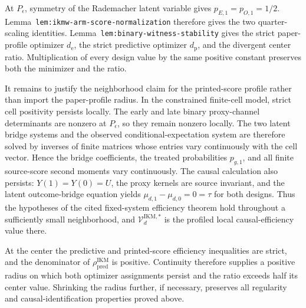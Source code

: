 At \(P_\epsilon\), symmetry of the Rademacher latent variable gives \(p_{E,1}=p_{O,1}=1/2\). Lemma~\texttt{lem:ikmw-arm-score-normalization} therefore gives the two quarter-scaling identities. Lemma~\texttt{lem:binary-witness-stability} gives the strict paper-profile optimizer \(d_{\mathrm e}\), the strict predictive optimizer \(d_{\mathrm p}\), and the divergent center ratio. Multiplication of every design value by the same positive constant preserves both the minimizer and the ratio.

It remains to justify the neighborhood claim for the printed-score profile rather than import the paper-profile radius.  In the constrained finite-cell model, strict cell positivity persists locally.  The early and late binary proxy-channel determinants are nonzero at \(P_\epsilon\), so they remain nonzero locally.  The two latent bridge systems and the observed conditional-expectation system are therefore solved by inverses of finite matrices whose entries vary continuously with the cell vector.  Hence the bridge coefficients, the treated probabilities \(p_{g,1}\), and all finite source-score second moments vary continuously.  The causal calculation also persists: \(Y(1)=Y(0)=U\), the proxy kernels are source invariant, and the latent outcome-bridge equation yields \(\mu_{d,1}-\mu_{d,0}=0=\tau\) for both designs.  Thus the hypotheses of the cited fixed-system efficiency theorem hold throughout a sufficiently small neighborhood, and \(\mathcal V_d^{\mathrm{IKM},*}\) is the profiled local causal-efficiency value there.

At the center the predictive and printed-score efficiency inequalities are strict, and the denominator of \(\rho_{\mathrm{pred}}^{\mathrm{IKM}}\) is positive. Continuity therefore supplies a positive radius on which both optimizer assignments persist and the ratio exceeds half its center value. Shrinking the radius further, if necessary, preserves all regularity and causal-identification properties proved above.